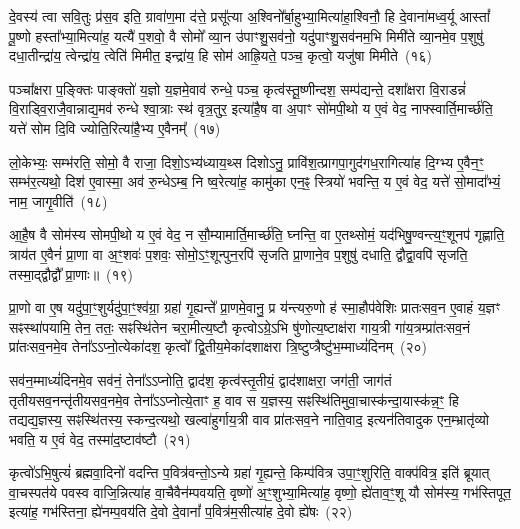 {\anuvakamend[{वा॒चो हव॑म॒भिघृ॑तानां गृह्णात्यु॒त पञ्च॑विꣳशतिश्च}]}%

दे॒वस्य॑ त्वा सवि॒तुः प्र॑स॒व इति॒ ग्रावा॑ण॒मा द॑त्ते॒ प्रसू᳚त्या अ॒श्विनो᳚र्बा॒हुभ्या॒मित्या॑हा॒श्विनौ॒ हि दे॒वाना॑मध्व॒र्यू आस्तां᳚ पू॒ष्णो हस्ता᳚भ्या॒मित्या॑ह॒ यत्यै॑ प॒शवो॒ वै सोमो᳚ व्या॒न उ॑पाꣳशु॒सव॑नो॒ यदु॑पाꣳशु॒सव॑नम॒भि मिमी॑ते व्या॒नमे॒व प॒शुषु॑ दधा॒तीन्द्रा॑य॒ त्वेन्द्रा॑य॒ त्वेति॑ मिमीत॒ इन्द्रा॑य॒ हि सोम॑ आह्रि॒यते॒ पञ्च॒ कृत्वो॒ यजु॑षा मिमीते~(१६)

पञ्चा᳚क्षरा प॒ङ्क्तिः पाङ्क्तो॑ य॒ज्ञो य॒ज्ञमे॒वाव॑ रुन्धे॒ पञ्च॒ कृत्व॑स्तू॒ष्णीन्दश॒ सम्प॑द्यन्ते॒ दशा᳚क्षरा वि॒राडन्नं॑ वि॒राड्वि॒राजै॒वान्नाद्य॒मव॑ रुन्धे श्वा॒त्राः स्थ॑ वृत्र॒तुर॒ इत्या॑है॒ष वा अ॒पाꣳ सो॑मपी॒थो य ए॒वं वेद॒ नाफ्स्वार्ति॒मार्च्छ॑ति॒ यत्ते॑ सोम दि॒वि ज्योति॒रित्या॑है॒भ्य ए॒वैनम्᳚~(१७)

लो॒केभ्यः॒ सम्भ॑रति॒ सोमो॒ वै राजा॒ दिशो॒\-ऽभ्य॑ध्याय॒थ्स दिशो\-ऽनु॒ प्रावि॑श॒त्प्रागपा॒गुद॑गध॒रागित्या॑ह दि॒ग्भ्य ए॒वैन॒ꣳ॒ सम्भ॑र॒त्यथो॒ दिश॑ ए॒वास्मा॒ अव॑ रु॒न्धे\-ऽम्ब॒ नि ष्व॒रेत्या॑ह॒ कामु॑का एन॒ꣴ॒ स्त्रियो॑ भवन्ति॒ य ए॒वं वेद॒ यत्ते॑ सो॒मादा᳚भ्यं॒ नाम॒ जागृ॒वीति॑~(१८)

आ॒है॒ष वै सोम॑स्य सोमपी॒थो य ए॒वं वेद॒ न सौ॒म्यामार्ति॒मार्च्छ॑ति॒ घ्नन्ति॒ वा ए॒तथ्सोमं॒ यद॑भिषु॒ण्वन्त्य॒ꣳ॒शूनप॑ गृह्णाति॒ त्राय॑त ए॒वैनं॑ प्रा॒णा वा अ॒ꣳ॒शवः॑ प॒शवः॒ सोमो॒\-ऽꣳ॒शून्पुन॒रपि॑ सृजति प्रा॒णाने॒व प॒शुषु॑ दधाति॒ द्वौद्वा॒वपि॑ सृजति॒ तस्मा॒द्द्वौद्वौ᳚ प्रा॒णाः॥~(१९)

{\anuvakamend[{यजु॑षा मिमीत एनं॒ जागृ॒वीति॒ चतु॑श्चत्वारिꣳशच्च}]}%

प्रा॒णो वा ए॒ष यदु॑पा॒ꣳ॒शुर्यदु॑पा॒ꣳ॒श्व॑ग्रा॒ ग्रहा॑ गृ॒ह्यन्ते᳚ प्रा॒णमे॒वानु॒ प्र य॑न्त्यरु॒णो ह॑ स्मा॒हौप॑वेशिः प्रातःसव॒न ए॒वाहं य॒ज्ञꣳ सꣴस्था॑पयामि॒ तेन॒ ततः॒ सꣴस्थि॑तेन चरा॒मीत्य॒ष्टौ कृत्वो\-ऽग्रे॒\-ऽभि षु॑णोत्य॒ष्टाक्ष॑रा गाय॒त्री गा॑य॒त्रम्प्रा॑तःसव॒नं प्रा॑तःसव॒नमे॒व तेना᳚ऽऽप्नो॒त्येका॑\-दश॒ कृत्वो᳚ द्वि॒तीय॒मेका॑\-दशाक्षरा त्रि॒ष्टुप्त्रैष्टु॑भ॒म्माध्यं॑दिनम्~(२०)

सव॑न॒म्माध्यं॑दिनमे॒व सव॑नं॒ तेना᳚ऽऽप्नोति॒ द्वाद॑श॒ कृत्व॑स्तृ॒तीयं॒ द्वाद॑शाक्षरा॒ जग॑ती॒ जाग॑तं तृतीयसव॒नन्तृ॑तीयसव॒नमे॒व तेना᳚ऽऽप्नोत्ये॒ताꣳ ह॒ वाव स य॒ज्ञस्य॒ सꣴस्थि॑तिमुवा॒चास्क॑न्दा॒यास्क॑न्न॒ꣳ॒ हि तद्यद्य॒ज्ञस्य॒ सꣴस्थि॑तस्य॒ स्कन्द॒त्यथो॒ खल्वा॑हुर्गाय॒त्री वाव प्रा॑तःसव॒ने नाति॒वाद॒ इत्यन॑तिवादुक एन॒म्भ्रातृ॑व्यो भवति॒ य ए॒वं वेद॒ तस्मा॑द॒ष्टाव॑ष्टौ~(२१)

कृत्वो॑\-ऽभि॒षुत्यं॑ ब्रह्मवा॒दिनो॑ वदन्ति प॒वित्र॑वन्तो॒\-ऽन्ये ग्रहा॑ गृ॒ह्यन्ते॒ किम्प॑वित्र उपा॒ꣳ॒शुरिति॒ वाक्प॑वित्र॒ इति॑ ब्रूयात् वा॒चस्पत॑ये पवस्व वाजि॒न्नित्या॑ह वा॒चैवैन॑म्पवयति॒ वृष्णो॑ अ॒ꣳ॒शुभ्या॒मित्या॑ह॒ वृष्णो॒ ह्ये॑ताव॒ꣳ॒शू यौ सोम॑स्य॒ गभ॑स्तिपूत॒ इत्या॑ह॒ गभ॑स्तिना॒ ह्ये॑नम्प॒वय॑ति दे॒वो दे॒वानां᳚ प॒वित्र॑म॒सीत्या॑ह दे॒वो ह्ये॑षः~(२२)

